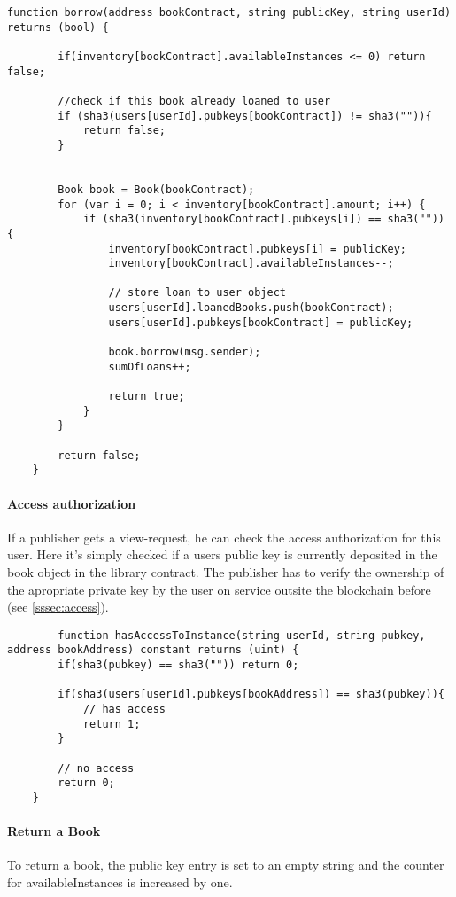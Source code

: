 \begin{lstlisting}
function borrow(address bookContract, string publicKey, string userId) returns (bool) {

		if(inventory[bookContract].availableInstances <= 0) return false;

		//check if this book already loaned to user
        if (sha3(users[userId].pubkeys[bookContract]) != sha3("")){
            return false;
        }


		Book book = Book(bookContract);
        for (var i = 0; i < inventory[bookContract].amount; i++) {
            if (sha3(inventory[bookContract].pubkeys[i]) == sha3("")) {
                inventory[bookContract].pubkeys[i] = publicKey;
                inventory[bookContract].availableInstances--;

                // store loan to user object
                users[userId].loanedBooks.push(bookContract);
                users[userId].pubkeys[bookContract] = publicKey;

                book.borrow(msg.sender);
                sumOfLoans++;

                return true;
            }
        }

        return false;
	}
\end{lstlisting}

\paragraph*{Access authorization \label{sssec:contractaccess}}
If a publisher gets a view-request, he can check the access authorization for this user. Here it's simply checked if a users public key is currently deposited in the book object in the library contract.
The publisher has to verify the ownership of the apropriate private key by the user on service outsite the blockchain before (see \ref{sssec:access}).

\begin{lstlisting}
	    function hasAccessToInstance(string userId, string pubkey, address bookAddress) constant returns (uint) {
        if(sha3(pubkey) == sha3("")) return 0;

        if(sha3(users[userId].pubkeys[bookAddress]) == sha3(pubkey)){
            // has access
            return 1;
        }

        // no access
        return 0;
    }
\end{lstlisting}


\paragraph*{Return a Book}
To return a book, the public key entry is set to an empty string and the counter for availableInstances is increased by one.

